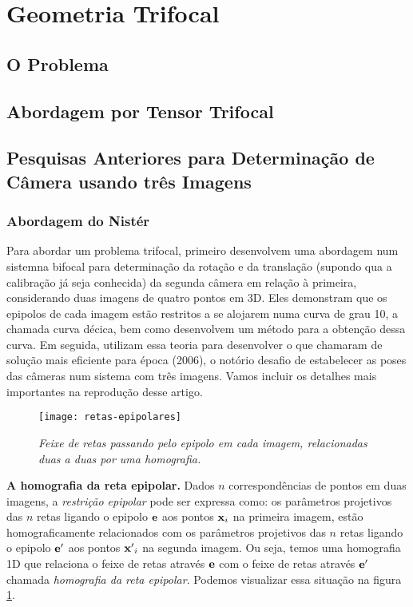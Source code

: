 \section{Geometria Trifocal}

\subsection{O Problema}

\subsection{Abordagem por Tensor Trifocal}

\subsection{Pesquisas Anteriores para Determinação de Câmera usando três Imagens}

\subsubsection{Abordagem do Nistér}

Para abordar um problema trifocal, primeiro \cite{2503343} desenvolvem uma abordagem num sistemna bifocal para determinação da rotação e da translação (supondo qua a calibração já seja conhecida) da segunda câmera em relação à primeira, considerando duas imagens de quatro pontos em 3D. Eles demonstram que os epipolos de cada imagem estão restritos a se alojarem numa curva de grau 10, a chamada curva décica, bem como desenvolvem um método para a obtenção dessa curva. Em seguida, utilizam essa teoria para desenvolver o que chamaram de solução mais eficiente para época (2006), o notório desafio de estabelecer as poses das câmeras num sistema com três imagens. Vamos incluir os detalhes mais importantes na reprodução desse artigo. 

\begin{figure}[!htb]
\centering
\texttt{[image: retas-epipolares]}
\caption{\textit{Feixe de retas passando pelo epipolo em cada imagem, relacionadas duas a duas por uma homografia.}}
\label{retas-epipolares}
\end{figure}

{\bf A homografia da reta epipolar.} Dados $n$ correspondências de pontos em duas imagens, a \textit{restrição epipolar} \citep{faugeras93three} pode ser expressa como: os parâmetros projetivos das $n$ retas ligando o epipolo ${\bf e}$ aos pontos ${\bf x}_i$ na primeira imagem, estão homograficamente relacionados com os parâmetros projetivos das $n$ retas ligando o epipolo ${\bf e'}$ aos pontos ${\bf x'}_i$ na segunda imagem. Ou seja, temos uma homografia 1D que relaciona o feixe de retas através ${\bf e}$ com o feixe de retas através ${\bf e'}$ chamada \textit{homografia da reta epipolar}. Podemos visualizar essa situação na figura \ref{retas-epipolares}.


